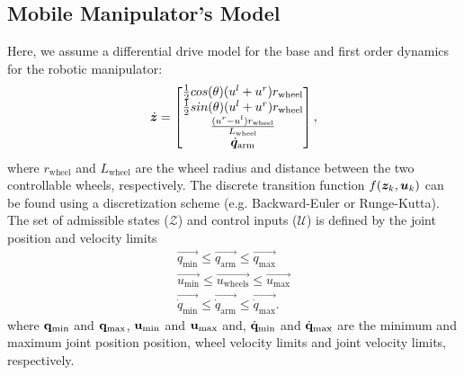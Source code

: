 \subsection{Mobile Manipulator's Model}%
\label{sub:transition_function}
%
 Here, we assume a differential drive model for the base and first order dynamics for the robotic manipulator:
\begin{equation}
    \dot{\bm{z}} = \begin{bmatrix} \frac{1}{2}cos(\theta)(u^l + u^r) r_{\textrm{wheel}} \\
                                      \frac{1}{2}sin(\theta)(u^l + u^r) r_{\textrm{wheel}} \\
                                      \frac{(u^r - u^l)r_{\textrm{wheel}}}{L_{\textrm{wheel}}} \\
                                      \dot{\bm{q}}_{\textrm{arm}} \end{bmatrix}, 
\end{equation}
where $r_{\textrm{wheel}}$ and $L_{\textrm{wheel}}$ are the wheel radius and distance between the two controllable wheels, respectively. The discrete transition function $f(\bm{z}_k, \bm{u}_k)$ can be found using a discretization scheme (e.g. Backward-Euler or Runge-Kutta).
The set of admissible states ($\mathcal{Z}$) and control inputs ($\mathcal{U}$) is defined by the joint position and velocity limits
\begin{equation}
  \begin{split}
    \vec{q_{\textrm{min}}} \leq \vec{q_{\textrm{arm}}} \leq \vec{q_{\textrm{max}}} \\ 
    \vec{u_{\textrm{min}}} \leq \vec{u_{\textrm{wheels}}} \leq \vec{u_{\textrm{max}}} \\
    \vec{\dot{q}_{\textrm{min}}} \leq \vec{\dot{q}_{\textrm{arm}}} \leq \vec{\dot{q}_{\textrm{max}}}.
\end{split}
\end{equation}
where $\mathbf{q}_{\textrm{min}}$ and $\mathbf{q}_{\textrm{max}}$, $\mathbf{u}_{\textrm{min}}$ and $\mathbf{u}_{\textrm{max}}$ and, $\dot{\mathbf{q}}_{\textrm{min}}$ and $\dot{\mathbf{q}}_{\textrm{max}}$ are the minimum and maximum joint position position, wheel velocity limits and joint velocity limits, respectively.


